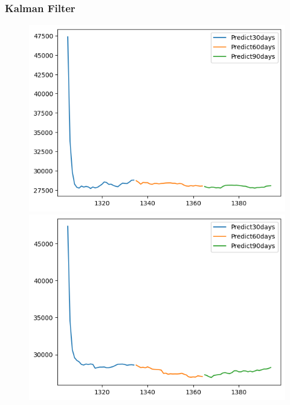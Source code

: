 



\subsubsection{Kalman Filter}
\begin{figure}[H]
    \centering
    \begin{minipage}{0.15\textwidth}
    \centering
    \includegraphics[width=1\textwidth]{resources/chapter-5/newdata1/predicted/KF_BIDV_7_3_30days.png}
    \end{minipage}
    \hfill
    \begin{minipage}{0.15\textwidth}
    \centering
    \includegraphics[width=1\textwidth]{resources/chapter-5/newdata1/predicted/KF_BIDV_8_2_30days.png}

\end{minipage}
\end{figure}
